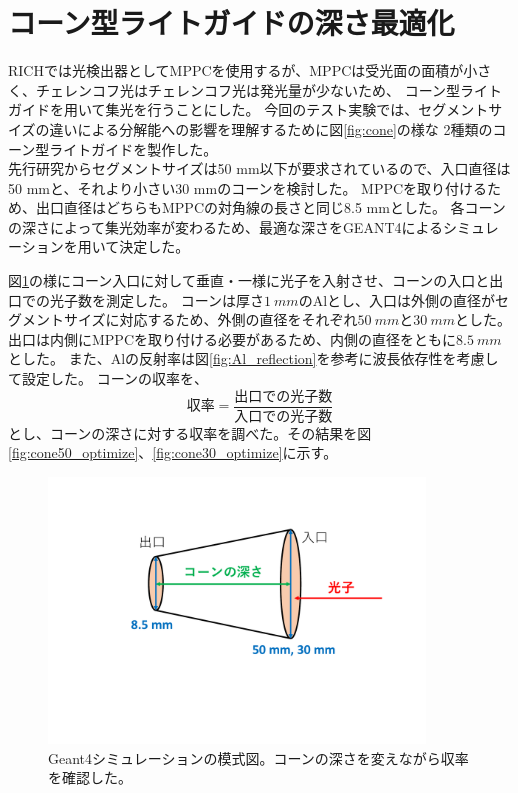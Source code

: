 \section{コーン型ライトガイドの深さ最適化}
RICHでは光検出器としてMPPCを使用するが、MPPCは受光面の面積が小さく、チェレンコフ光はチェレンコフ光は発光量が少ないため、
コーン型ライトガイドを用いて集光を行うことにした。
今回のテスト実験では、セグメントサイズの違いによる分解能への影響を理解するために図\ref{fig:cone}の様な
2種類のコーン型ライトガイドを製作した。\\
先行研究からセグメントサイズは50 mm以下が要求されているので、入口直径は50 mmと、それより小さい30 mmのコーンを検討した。
MPPCを取り付けるため、出口直径はどちらもMPPCの対角線の長さと同じ8.5 mmとした。
各コーンの深さによって集光効率が変わるため、最適な深さをGEANT4によるシミュレーションを用いて決定した。\\\indent

図\ref{fig:cone_optimize}の様にコーン入口に対して垂直・一様に光子を入射させ、コーンの入口と出口での光子数を測定した。
コーンは厚さ$\SI{1}{mm}$のAlとし、入口は外側の直径がセグメントサイズに対応するため、外側の直径をそれぞれ$\SI{50}{mm}$と$\SI{30}{mm}$とした。
出口は内側にMPPCを取り付ける必要があるため、内側の直径をともに$\SI{8.5}{mm}$とした。
また、Alの反射率は図\ref{fig:Al_reflection}を参考に波長依存性を考慮して設定した。
コーンの収率を、
\begin{equation}
  \label{eq:cone_yield}
  \mbox{収率} = \frac{\mbox{出口での光子数}}{\mbox{入口での光子数}}
\end{equation}
とし、コーンの深さに対する収率を調べた。その結果を図\ref{fig:cone50_optimize}、\ref{fig:cone30_optimize}に示す。
\begin{figure}
  \centering
  \includegraphics[width=10cm]{images/chapter3/cone_optimize.pdf}
  \caption{Geant4シミュレーションの模式図。コーンの深さを変えながら収率を確認した。}
  \label{fig:cone_optimize}
\end{figure}


